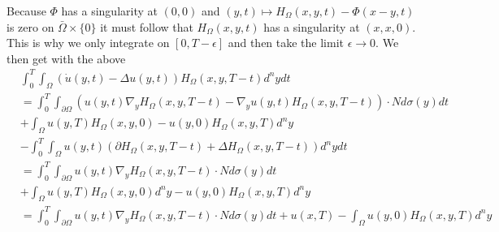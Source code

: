 \documentclass[A4,12pt,twoside]{book}
\begin{document}
Because $\Phi$ has a singularity at $(0,0)$ and $(y,t) \mapsto H_\Omega (x,y,t)- \Phi (x-y,t)$ is zero on $ \bar{\Omega} \times \{0\}$ it must follow that $H_\Omega (x,y,t)$ has a singularity at $(x,x,0)$.\\
This is why we only integrate on $[0,T-\epsilon]$ and then take the limit $\epsilon \to 0$. We then get with the above 
\begin{align*}
    &\int_0^T \int_\Omega \left( \dot{u}(y,t) - \Delta u(y,t) \right) H_\Omega (x,y,T-t) d^n y dt \\
    &= \int_0^T \int_{\partial \Omega} \left( u(y,t) \nabla_y H_\Omega (x,y,T-t) - \nabla_y u(y,t) H_\Omega (x,y,T-t) \right) \cdot N d \sigma (y) dt \\
    &+ \int_\Omega u(y,T) H_\Omega (x,y,0) - u(y,0) H_\Omega (x,y,T) d^n y \\
   & - \int_0^T \int_\Omega u(y,t) \left( \partial H_\Omega (x,y,T-t) + \Delta H_\Omega (x,y,T-t) \right) d^n y dt \\
    &= \int_0^T \int_{\partial \Omega}  u(y,t) \nabla_y H_\Omega (x,y,T-t)  \cdot N d \sigma (y) dt \\
    &+ \int_\Omega u(y,T) H_\Omega (x,y,0) d^n y - u(y,0)  H_\Omega (x,y,T) d^n y \\
    &= \int_0^T \int_{\partial \Omega}  u(y,t) \nabla_y H_\Omega (x,y,T-t)  \cdot N d \sigma (y) dt +  u(x,T) -\int_\Omega u(y,0) H_\Omega (x,y,T) d^n y \\
\end{align*}
\end{document}
